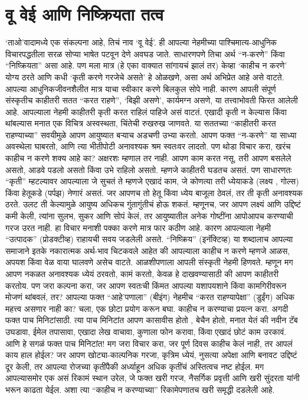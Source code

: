  \chapter{वू वेई आणि निष्क्रियता तत्व}
‘ताओ’वादामध्ये एक संकल्पना आहे, तिचं  नाव ‘वू वेई’. ही आपल्या नेहमीच्या पाश्चिमात्य-आधुनिक विचारपद्धतीला सरळ सोप्या भाषेत पटवून देणे अवघड जाते. साधारणपणे तिचा अर्थ “न-करणे” किंवा “निष्क्रियता” असा आहे. पण मला मात्र (हे एका वाक्यात सांगायचं झालं तर) केव्हा ‘काहीच न करणे’ योग्य ठरते आणि कधी ‘कृती करणे गरजेचे असते’ हे ओळखणे, असा अर्थ अभिप्रेत आहे असे वाटते.
आपल्या आधुनिकजीवनशैलीत मात्र याचा स्वीकार करणे बिलकुल सोपे नाही. कारण आपली संपूर्ण संस्कृतीच काहीतरी सतत “करत राहणे”, ‘बिझी असणे’, कार्यमग्न असणे, या तत्त्वाभोवती फिरत आलेली आहे. आपल्याला नेहमी काहीतरी कृती करत राहिलं पाहिजे असं वाटतं. एखादी कृती न केल्यास किंवा थांबल्यास मनात एक विचित्र अस्वस्थता, चिंतेची रुखरुख जाणवते. या सततच्या “काहीतरी करत राहण्याच्या” सवयीमुळे आपण आयुष्यात बऱ्याच अडचणी उभ्या करतो. आपण फक्त “न-करणे” या साध्या अवस्थेला घाबरतो, आणि त्या भीतीपोटी अनावश्यक श्रम स्वतःवर लादतो.
पण थोडा विचार करा, खरंच काहीच न करणे शक्य आहे का? अक्षरशः म्हणाल तर नाही. आपण काम करत नसू, तरी आपण बसलेले असतो, आडवे पडलो असतो किंवा उभे राहिलो असतो. म्हणजे काहीतरी घडतच असतं. पण साधारणतः “कृती” म्हटल्यावर आपल्याला जे सुचतं ते म्हणजे एखादं काम, जे कोणत्या तरी ध्येयाकडे (लक्ष्य , गोल्स) किंवा हेतूकडे (पर्पझ) नेणारं असतं. जर आपणच तो हेतू किंवा ध्येय बाजूला ठेवलं, तर ती कृती अनावश्यक ठरते. उलट ती केल्यामुळे आयुष्य अधिकच गुंतागुंतीचं होऊ शकतं.
म्हणूनच, जर आपण लक्ष्यं आणि उद्दिष्टं कमी केली, त्यांना सुलभ, सुकर आणि सोपं केलं, तर आयुष्यातील अनेक गोष्टींना आपोआपच करण्याची गरज उरत नाही.
हा विचार मनाशी पक्का करणे मात्र फार कठीण आहे. कारण आपल्याला नेहमी “उत्पादक” (प्रोडक्टीव्ह) राहायची सवय जडलेली असते. “निष्क्रिय” (इनॅक्टिव्ह) या शब्दालाच आपल्या समाजाने इतके नकारात्मक अर्थ-भाव चिटकवले आहेत की आपल्याला काहीच न करणे म्हणजे आळस, अपयश किंवा वेळ वाया घालवणे असेच वाटते. आळशीपणाला आपली संस्कृती नेहमी हिणवते. म्हणून मग आपण नकळत अनावश्यक ध्येयं ठरवतो, कामं करतो, केवळ हे दाखवण्यासाठी की आपण काहीतरी करतोय.
पण जरा कल्पना करा, जर आपण स्वतःची किंमत आपल्या यशापयशाने किंवा कामगिरीवरून मोजणं थांबवलं, तर? आपल्या फक्त “आहे’पणाला” (बीइंग) नेहमीच “करत राहण्यापेक्षा” (डुईंग) अधिक महत्त्व असणार नाही का?
चला, एक छोटा प्रयोग करून बघा. काहीच न करण्याचा प्रयत्न करा. अगदी फक्त पाच मिनिटांसाठी. त्या पाच मिनिटांत आपण कासावीस होतो , बेचैन होतो, मनात येतं की नवीन टॅब उघडावा, ईमेल तपासावा, एखादा लेख वाचावा, कुणाला फोन करावा, किंवा एखादं छोटं काम उरकावं. आणि हे सगळं फक्त पाच मिनिटांत! मग जरा विचार करा, जर पूर्ण दिवस काहीच केलं नाही, तर आपलं काय हाल होईल?
जर आपण खोट्या-काल्पनिक गरजा, कृत्रिम ध्येयं, नुसत्या अपेक्षा आणि बनावट उद्दिष्टं दूर केली, तर आपल्या रोजच्या कृतींपैकी अर्ध्याहून अधिक कृतींचं अस्तित्वच नष्ट होईल. मग आपल्यासमोर एक असं रिकामं स्थान उरेल, जे फक्त खरी गरज, नैसर्गिक प्रवृत्ती आणि खरी सुंदरता यांनी भरून काढता येईल.
अशा त्या “काहीच न करण्याच्या” रिकामेपणातच खरी समृद्धी दडलेली आहे.
